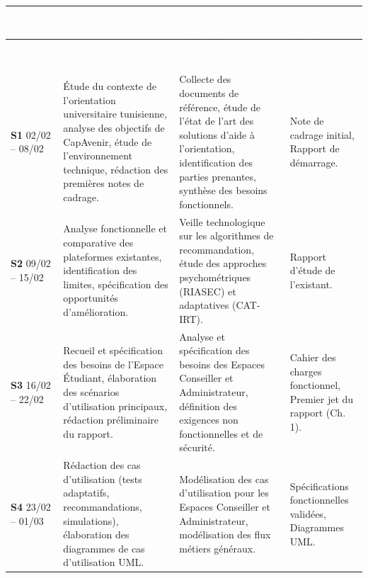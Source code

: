 \begin{longtable}{|p{1.5cm}|p{5.0cm}|p{5.0cm}|p{3.5cm}|}
\hline
\rowcolor{headercolor}
\textcolor{white}{\textbf{Semaine}} & \textcolor{white}{\textbf{Binôme 1 (Moi)}} & \textcolor{white}{\textbf{Binôme 2 (Collègue)}} & \textcolor{white}{\textbf{Livrables / Jalons}} \\
\hline
\endfirsthead
\hline
\rowcolor{headercolor}
\textcolor{white}{\textbf{Semaine}} & \textcolor{white}{\textbf{Binôme 1 (Moi)}} & \textcolor{white}{\textbf{Binôme 2 (Collègue)}} & \textcolor{white}{\textbf{Livrables / Jalons}} \\
\hline
\endhead
\hline
\endfoot
\hline
\endlastfoot

\textbf{S1} \newline \scriptsize 02/02 -- 08/02 & Étude du contexte de l'orientation universitaire tunisienne, analyse des objectifs de CapAvenir, étude de l'environnement technique, rédaction des premières notes de cadrage. & Collecte des documents de référence, étude de l'état de l'art des solutions d'aide à l'orientation, identification des parties prenantes, synthèse des besoins fonctionnels. & Note de cadrage initial, Rapport de démarrage. \\
\hline
\rowcolor{rowgray}
\textbf{S2} \newline \scriptsize 09/02 -- 15/02 & Analyse fonctionnelle et comparative des plateformes existantes, identification des limites, spécification des opportunités d'amélioration. & Veille technologique sur les algorithmes de recommandation, étude des approches psychométriques (RIASEC) et adaptatives (CAT-IRT). & Rapport d'étude de l'existant. \\
\hline
\textbf{S3} \newline \scriptsize 16/02 -- 22/02 & Recueil et spécification des besoins de l'Espace Étudiant, élaboration des scénarios d'utilisation principaux, rédaction préliminaire du rapport. & Analyse et spécification des besoins des Espaces Conseiller et Administrateur, définition des exigences non fonctionnelles et de sécurité. & Cahier des charges fonctionnel, Premier jet du rapport (Ch. 1). \\
\hline
\rowcolor{rowgray}
\textbf{S4} \newline \scriptsize 23/02 -- 01/03 & Rédaction des cas d'utilisation (tests adaptatifs, recommandations, simulations), élaboration des diagrammes de cas d'utilisation UML. & Modélisation des cas d'utilisation pour les Espaces Conseiller et Administrateur, modélisation des flux métiers généraux. & Spécifications fonctionnelles validées, Diagrammes UML. \\

\end{longtable}
